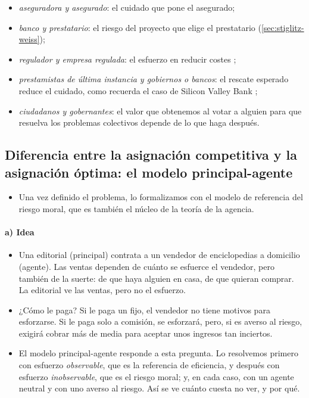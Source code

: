 \documentclass[11pt]{article}
\begin{document}
\begin{itemize}
\begin{itemize}
  \item \emph{aseguradora y asegurado}: el cuidado que pone el asegurado;
  \item \emph{banco y prestatario}: el riesgo del proyecto que elige el prestatario (\ref{sec:stiglitz-weiss});
  \item \emph{regulador y empresa regulada}: el esfuerzo en reducir costes ;
  \item \emph{prestamistas de última instancia y gobiernos o bancos}: el rescate esperado reduce el cuidado, como recuerda el caso de Silicon Valley Bank ;
  \item \emph{ciudadanos y gobernantes}: el valor que obtenemos al votar a alguien para que resuelva los problemas colectivos depende de lo que haga después.
  \end{itemize}
\end{itemize}

\subsection{Diferencia entre la asignación competitiva y la asignación óptima:\cortetitulo{} el modelo principal-agente}\label{sec:principal-agente}

\begin{itemize}
\item Una vez definido el problema, lo formalizamos con el modelo de referencia del riesgo moral, que es también el núcleo de la teoría de la agencia.
\end{itemize}

\paragraph{a) Idea}

\begin{itemize}
\item Una editorial (principal) contrata a un vendedor de enciclopedias a domicilio (agente). Las ventas dependen de cuánto se esfuerce el vendedor, pero también de la suerte: de que haya alguien en casa, de que quieran comprar. La editorial ve las ventas, pero no el esfuerzo.
\item ¿Cómo le paga? Si le paga un fijo, el vendedor no tiene motivos para esforzarse. Si le paga solo a comisión, se esforzará, pero, si es averso al riesgo, exigirá cobrar más de media para aceptar unos ingresos tan inciertos.
\item El modelo principal-agente responde a esta pregunta. Lo resolvemos primero con esfuerzo \emph{observable}, que es la referencia de eficiencia, y después con esfuerzo \emph{inobservable}, que es el riesgo moral; y, en cada caso, con un agente neutral y con uno averso al riesgo. Así se ve cuánto cuesta no ver, y por qué.
\end{itemize}
\end{document}
